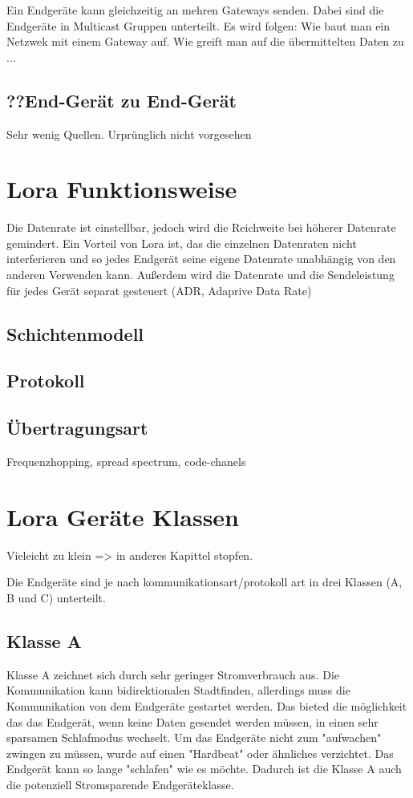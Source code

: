 \documentclass[a4paper,12pt]{article}
\begin{document}
    Ein Endgeräte kann gleichzeitig an mehren Gateways senden. Dabei sind die Endgeräte in Multicast Gruppen unterteilt.
        \cite{TheThing}
        \cite{WhatIsLoRa}
        \cite{LoRaSpec}
        \cite{RFC8376}
    \newline{}\newline{} Es wird folgen: Wie baut man ein Netzwek mit einem Gateway auf. Wie greift man auf die übermittelten Daten zu ...
    \subsection{??End-Gerät zu End-Gerät}
    Sehr wenig Quellen. Urprünglich nicht vorgesehen
    \section{Lora Funktionsweise}
    Die Datenrate ist einstellbar, jedoch wird die Reichweite bei höherer Datenrate gemindert. Ein Vorteil von Lora ist, das die einzelnen Datenraten nicht interferieren und so jedes Endgerät seine eigene Datenrate unabhängig von den anderen Verwenden kann.
    Außerdem wird die Datenrate und die Sendeleistung für jedes Gerät separat gesteuert (ADR, Adaprive Data Rate)
        \cite{RFC8376}
        \cite{LoRaSpec}
    \subsection{Schichtenmodell}
    \subsection{Protokoll}
    \subsection{Übertragungsart}
    Frequenzhopping, spread spectrum, code-chanels
    \section{Lora Geräte Klassen}
    Vieleicht zu klein => in anderes Kapittel stopfen.

    Die Endgeräte sind je nach kommunikationsart/protokoll art in drei Klassen (A, B und C) unterteilt. 
        \cite{RFC8376}
        \cite{LoraClasses}
    \subsection{Klasse A}
    Klasse A zeichnet sich durch sehr geringer Stromverbrauch aus. Die Kommunikation kann bidirektionalen Stadtfinden, allerdings muss die Kommunikation von dem Endgeräte gestartet werden. Das bieted die möglichkeit das das Endgerät, wenn keine Daten gesendet werden müssen, in einen sehr
    sparsamen Schlafmodus wechselt. Um das Endgeräte nicht zum "aufwachen" zwingen zu müssen, wurde auf einen "Hardbeat" oder ähnliches verzichtet. Das Endgerät kann so lange "schlafen" wie es möchte. Dadurch ist die Klasse A auch die potenziell Stromsparende Endgeräteklasse.
    
\end{document}
